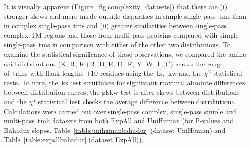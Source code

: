 It is visually apparent (Figure~\ref{fig:complexity_datasets}) that there are (i) stronger skews and more inside-outside disparities in simple single-pass~\gls{tm}s than in complex single-pass~\gls{tm}s and (ii) greater similarities between single-pass complex TM regions and those from multi-pass proteins compared with simple single-pass~\gls{tm}s in comparison with either of the other two distributions.
To examine the statistical significance of these observations, we compared the amino acid distributions (K, R, K+R, D, E, D+E, Y, W, L, C) across the range of~\gls{tmh}s with flank lengths $\pm$10 residues using the~\gls{ks},~\gls{kw} and the \({\chi}^{2}\) statistical tests.
To note, the~\gls{ks} test scrutinises for significant maximal absolute differences between distribution curves; the gls{kw} test is after skews between distributions and the \({\chi}^{2}\) statistical test checks the average difference between distributions.
Calculations were carried out over single-pass complex, single-pass simple and multi-pass~\gls{tmh} datasets from both ExpAll and UniHuman (for P-values and Bahadur slopes, Table~\ref{table:unihumanbahadur} (dataset UniHuman) and Table~\ref{table:expallbahadur} (dataset ExpAll)).

